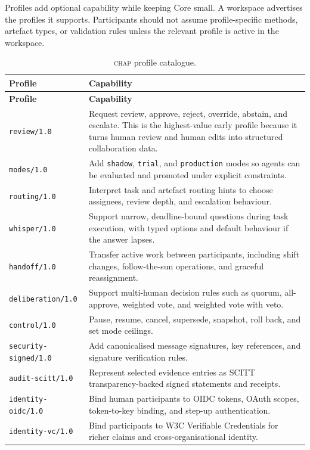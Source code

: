 \documentclass[11pt]{article}
\newcommand{\chap}{\textsc{chap}}
\begin{document}
Profiles add optional capability while keeping Core small. A workspace advertises the profiles it supports. Participants should not assume profile-specific methods, artefact types, or validation rules unless the relevant profile is active in the workspace.

\begin{longtable}{@{}p{4.2cm}p{10cm}@{}}
\caption{\chap{} profile catalogue.}
\label{tab:profiles}\\
\toprule
\textbf{Profile} & \textbf{Capability} \\
\midrule
\endfirsthead
\toprule
\textbf{Profile} & \textbf{Capability} \\
\midrule
\endhead
\texttt{review/1.0} & Request review, approve, reject, override, abstain, and escalate. This is the highest-value early profile because it turns human review and human edits into structured collaboration data. \\
\texttt{modes/1.0} & Add \texttt{shadow}, \texttt{trial}, and \texttt{production} modes so agents can be evaluated and promoted under explicit constraints. \\
\texttt{routing/1.0} & Interpret task and artefact routing hints to choose assignees, review depth, and escalation behaviour. \\
\texttt{whisper/1.0} & Support narrow, deadline-bound questions during task execution, with typed options and default behaviour if the answer lapses. \\
\texttt{handoff/1.0} & Transfer active work between participants, including shift changes, follow-the-sun operations, and graceful reassignment. \\
\texttt{deliberation/1.0} & Support multi-human decision rules such as quorum, all-approve, weighted vote, and weighted vote with veto. \\
\texttt{control/1.0} & Pause, resume, cancel, supersede, snapshot, roll back, and set mode ceilings. \\
\texttt{security-signed/1.0} & Add canonicalised message signatures, key references, and signature verification rules. \\
\texttt{audit-scitt/1.0} & Represent selected evidence entries as SCITT transparency-backed signed statements and receipts. \\
\texttt{identity-oidc/1.0} & Bind human participants to OIDC tokens, OAuth scopes, token-to-key binding, and step-up authentication. \\
\texttt{identity-vc/1.0} & Bind participants to W3C Verifiable Credentials for richer claims and cross-organisational identity. \\
\bottomrule
\end{longtable}
\end{document}
